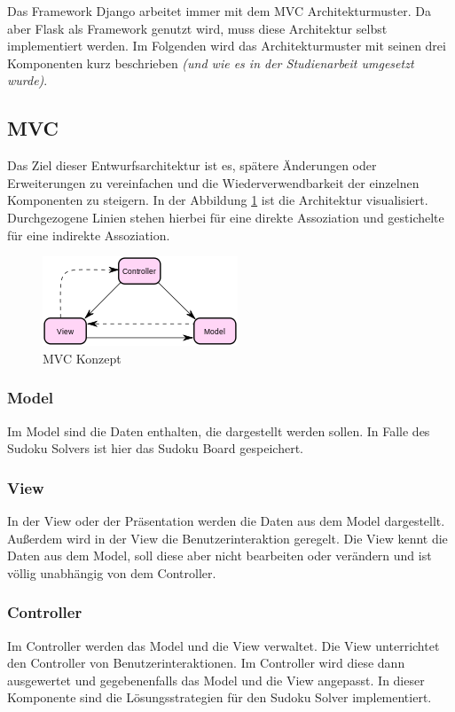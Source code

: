 Das Framework Django arbeitet immer mit dem \ac{MVC} Architekturmuster. Da aber Flask als Framework genutzt wird, muss diese Architektur selbst implementiert werden. Im Folgenden wird das Architekturmuster mit seinen drei Komponenten kurz beschrieben \textit{(und wie es in der Studienarbeit umgesetzt wurde)}.

\subsection{\acl{MVC}}
Das Ziel dieser Entwurfsarchitektur ist es, spätere Änderungen oder Erweiterungen zu vereinfachen und die Wiederverwendbarkeit der einzelnen Komponenten zu steigern. In der Abbildung \ref{fig:MVC} ist die Architektur visualisiert. Durchgezogene Linien stehen hierbei für eine direkte Assoziation und gestichelte für eine indirekte Assoziation.  

\begin{figure}[htbp]
	\centering
	\includegraphics{images/MVC.png}
	\caption{\ac{MVC} Konzept}
	\label{fig:MVC}
\end{figure}

\subsubsection{Model}
Im Model sind die Daten enthalten, die dargestellt werden sollen. In Falle des Sudoku Solvers ist hier das Sudoku Board gespeichert.
\subsubsection{View}
In der View oder der Präsentation werden die Daten aus dem Model dargestellt. Außerdem wird in der View die Benutzerinteraktion geregelt. Die View kennt die Daten aus dem Model, soll diese aber nicht bearbeiten oder verändern und ist völlig unabhängig von dem Controller.
\subsubsection{Controller}
Im Controller werden das Model und die View verwaltet. Die View unterrichtet den Controller von Benutzerinteraktionen. Im Controller wird diese dann ausgewertet und gegebenenfalls das Model und die View angepasst.  In dieser Komponente sind die Lösungsstrategien für den Sudoku Solver implementiert.
